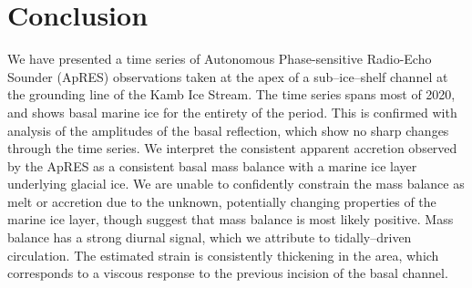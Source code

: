 \section{Conclusion}

We have presented a time series of Autonomous Phase-sensitive Radio-Echo Sounder (ApRES) observations taken at the apex of a sub--ice--shelf channel at the grounding line of the Kamb Ice Stream. The time series spans most of 2020, and shows basal marine ice for the entirety of the period. This is confirmed with analysis of the amplitudes of the basal reflection, which show no sharp changes through the time series. We interpret the consistent apparent accretion observed by the ApRES as a consistent basal mass balance with a marine ice layer underlying glacial ice.  We are unable to confidently constrain the mass balance as melt or accretion due to the unknown, potentially changing properties of the marine ice layer, though suggest that mass balance is most likely positive.  Mass balance has a strong diurnal signal, which we attribute to tidally--driven circulation. The estimated strain is consistently thickening in the area, which corresponds to a viscous response to the previous incision of the basal channel.


